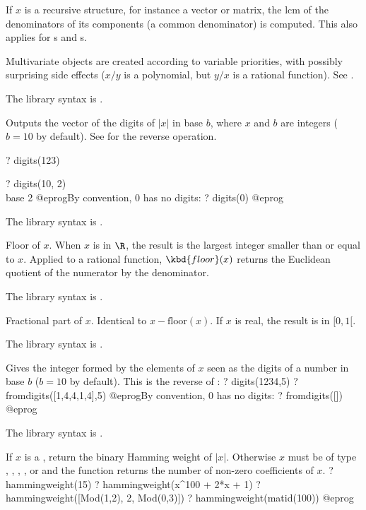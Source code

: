 If $x$ is a recursive structure, for instance a vector or matrix, the lcm
of the denominators of its components (a common denominator) is computed.
This also applies for s and s.

 Multivariate objects are created according to variable
priorities, with possibly surprising side effects ($x/y$ is a polynomial, but
$y/x$ is a rational function). See .

The library syntax is .

\label{se:digits}
Outputs the vector of the digits of $|x|$ in base $b$, where $x$ and $b$ are
integers ($b = 10$ by default). See  for the reverse
operation.

\bprog
? digits(123)

? digits(10, 2) \\ base 2
@eprog\noindent By convention, $0$ has no digits:
\bprog
? digits(0)
@eprog

The library syntax is .

\label{se:floor}
Floor of $x$. When $x$ is in $\R$, the result is the
largest integer smaller than or equal to $x$. Applied to a rational function,
$\kbd{floor}(x)$ returns the Euclidean quotient of the numerator by the
denominator.

The library syntax is .

\label{se:frac}
Fractional part of $x$. Identical to
$x-\text{floor}(x)$. If $x$ is real, the result is in $[0,1[$.

The library syntax is .

\label{se:fromdigits}
Gives the integer formed by the elements of $x$ seen as the digits of a
number in base $b$ ($b = 10$ by default).  This is the reverse of :
\bprog
? digits(1234,5)
? fromdigits([1,4,4,1,4],5)
@eprog\noindent By convention, $0$ has no digits:
\bprog
? fromdigits([])
@eprog

The library syntax is .

\label{se:hammingweight}
If $x$ is a , return the binary Hamming weight of $|x|$. Otherwise
$x$ must be of type , , , , or
 and the function returns the number of non-zero coefficients of
$x$.
\bprog
? hammingweight(15)
? hammingweight(x^100 + 2*x + 1)
? hammingweight([Mod(1,2), 2, Mod(0,3)])
? hammingweight(matid(100))
@eprog

